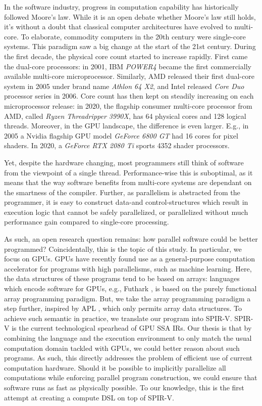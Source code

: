 \documentclass{IEEEtran}
\begin{document}
In the software industry, progress in computation capability has historically followed Moore's law. While it is an open debate whether Moore's law still holds, it's without a doubt that classical computer architectures have evolved to multi-core. To elaborate, commodity computers in the 20th century were single-core systems. This paradigm saw a big change at the start of the 21st century. During the first decade, the physical core count started to increase rapidly. First came the dual-core processors: in 2001, IBM \textit{POWER4} became the first commercially available multi-core microprocessor. Similarly, AMD released their first dual-core system in 2005 under brand name \textit{Athlon 64 X2}, and Intel released \textit{Core Duo} processor series in 2006. Core count has then kept on steadily increasing on each microprocessor release: in 2020, the flagship consumer multi-core processor from AMD, called \textit{Ryzen Threadripper 3990X}, has 64 physical cores and 128 logical threads. Moreover, in the \gls{GPU} landscape, the difference is even larger. E.g., in 2005 a Nvidia flagship GPU model \textit{GeForce 6800 GT} had 16 cores for pixel shaders. In 2020, a \textit{GeForce RTX 2080 Ti} sports 4352 shader processors. 

Yet, despite the hardware changing, most programmers still think of software from the viewpoint of a single thread. Performance-wise this is suboptimal, as it means that the way software benefits from multi-core systems are dependant on the smartness of the compiler. Further, as parallelism is abstracted from the programmer, it is easy to construct data-and control-structures which result in execution logic that cannot be safely parallelized, or parallelized without much performance gain compared to single-core processing.

As such, an open research question remains: how parallel software could be better programmed? Coincidentally, this is the topic of this study. In particular, we focus on \glspl{GPU}. \glspl{GPU} have recently found use as a general-purpose computation accelerator for programs with high parallelisms, such as machine learning. Here, the data structures of these programs tend to be based on arrays: languages which encode software for \glspl{GPU}, e.g., Futhark \cite{Henriksen:2017:FPF:3062341.3062354}, is based on the purely functional array programming paradigm. But, we take the array programming paradigm a step further, inspired by \gls{APL} \cite{hui2020apl}, which only permits array data structures. To achieve such semantic in practice, we translate our program into \gls{SPIR-V}. \gls{SPIR-V} is the current technological spearhead of \gls{GPU} \gls{SSA} \glspl{IR}. Our thesis is that by combining the language and the execution environment to only match the usual computation domain tackled with \glspl{GPU}, we could better reason about such programs. As such, this directly addresses the problem of efficient use of current computation hardware. Should it be possible to implicitly parallelize all computations while enforcing parallel program construction, we could ensure that software runs as fast as physically possible. To our knowledge, this is the first attempt at creating a compute \gls{DSL} on top of \gls{SPIR-V}.
\end{document}
